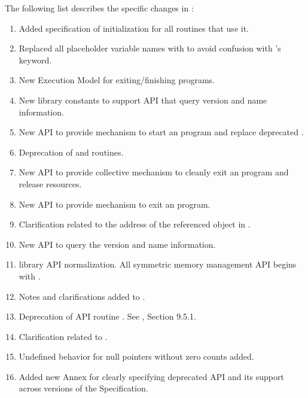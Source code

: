 The following list describes the specific changes in \openshmem[1.2]:
\begin{enumerate}
%
\item Added specification of  initialization for all routines that use it.
%
\item Replaced all placeholder variable names  with  to
      avoid confusion with \Fortran's  keyword.
%
\item New Execution Model for exiting/finishing \openshmem programs.
%
%
\item New library constants to support \ac{API} that query version and name information.
%
%
\item New \ac{API}  to provide mechanism to start an \openshmem
      program and replace deprecated .
%
%
\item Deprecation of  and  routines.
%
%
\item New \ac{API}  to provide collective mechanism to cleanly
      exit an \openshmem program and release resources.
%
%
\item New \ac{API}  to provide mechanism to exit an
    \openshmem program.
%
%
\item Clarification related to the address of the referenced object in
    .
%
%
\item New \ac{API} to query the version and name information.
%
%
\item \openshmem library \ac{API} normalization. All \Cstd symmetric memory management
      \ac{API} begins with .
%
%
\item Notes and clarifications added to .
%
%
\item Deprecation of \Fortran \ac{API} routine .
%
See \openshmem[1.4], Section 9.5.1.
%
\item Clarification related to .
%
%
\item Undefined behavior for null pointers without zero counts added.
%
%
\item Added new Annex for clearly specifying deprecated \ac{API} and its
      support across versions of the \openshmem Specification.
%
%
\end{enumerate}




